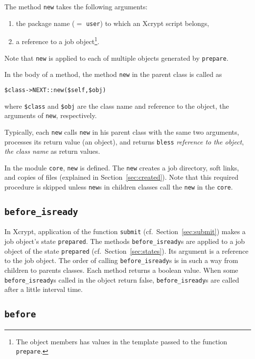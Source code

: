 \documentclass[a4paper,10pt]{report}
\def\|{\verb|} %|
\begin{document}
The method \|new| takes the following arguments:
\begin{enumerate}
\item the package name ($=$ \|user|) to which an Xcrypt script belongs,
\item a reference to a job object\footnote{The object members has
      values in the template passed to the function \texttt{prepare}.}.
\end{enumerate}
Note that \|new| is applied to each of multiple objects
generated by \|prepare|.

In the body of a method, the method \|new| in the parent class is
called as
\begin{center}
 \|$class->NEXT::new($self,$obj)|
\end{center}
where \|$class| and \|$obj| are the class name and reference to the
object, the arguments of \|new|, respectively.

Typically, each \|new| calls \|new| in his parent class with the same
two arguments, processes its return value (an object), and returns
\|bless| \textit{reference to the object},
\textit{the class name} as return values.

In the module \|core|, \|new| is defined.  The \|new| creates a job
directory, soft links, and copies of files (explained in
Section~\ref{sec:created}).  Note that this required procedure is
skipped unless \|new|s in children classes call the \|new| in the
\|core|.

\subsection{\texttt{before\_isready}}

In Xcrypt, application of the function \|submit| (cf.\
Section~\ref{sec:submit}) makes a job object's state \|prepared|.  The
methods \texttt{before\_isready}s are applied to a job object of the
state \|prepared| (cf.\ Section~\ref{sec:states}).  Its argument is a
reference to the job object.  The order of calling
\texttt{before\_isready}s is in such a way from children to parents
classes.  Each method returns a boolean value.  When some
\texttt{before\_isready}s called in the object return false,
\texttt{before\_isready}s are called after a little interval time.

\subsection{\texttt{before}}
\end{document}
